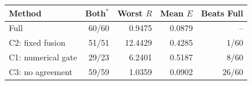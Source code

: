 \begin{tabular}{lrrrr}
\toprule
Method & Both$^*$ & Worst $R$ & Mean $E$ & Beats Full \\
\midrule
Full & 60/60 & 0.9475 & 0.0879 & -- \\
C2: fixed fusion & 51/51 & 12.4429 & 0.4285 & 1/60 \\
C1: numerical gate & 29/23 & 6.2401 & 0.5187 & 8/60 \\
C3: no agreement & 59/59 & 1.0359 & 0.0902 & 26/60 \\
\bottomrule
\end{tabular}
